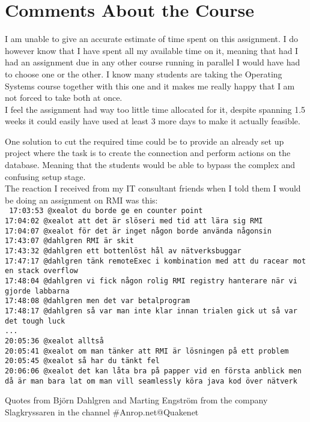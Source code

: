 \documentclass[a4paper]{scrartcl}
\begin{document}
\section{Comments About the Course}

I am unable to give an accurate estimate of time spent on this assignment. I do however know that I have spent all my available time on it, meaning that had I had an assignment due in any other course running in parallel I would have had to choose one or the other. I know many students are taking the Operating Systems course together with this one and it makes me really happy that I am not forced to take both at once.\\

I feel the assignment had way too little time allocated for it, despite spanning 1.5 weeks it could easily have used at least 3 more days to make it actually feasible.

One solution to cut the required time could be to provide an already set up project where the task is to create the connection and perform actions on the database. Meaning that the students would be able to bypass the complex and confusing setup stage.\\

The reaction I received from my IT consultant friends when I told them I would be doing an assignment on RMI was this:\\
\texttt{
17:03:53 @xealot du borde ge en counter point\\
17:04:02 @xealot att det är slöseri med tid att lära sig RMI\\
17:04:07 @xealot för det är inget någon borde använda någonsin\\
17:43:07 @dahlgren RMI är skit\\
17:43:32 @dahlgren ett bottenlöst hål av nätverksbuggar\\
17:47:17 @dahlgren tänk remoteExec i kombination med att du racear mot en stack overflow\\
17:48:04 @dahlgren vi fick någon rolig RMI registry hanterare när vi gjorde labbarna\\
17:48:08 @dahlgren men det var betalprogram\\
17:48:17 @dahlgren så var man inte klar innan trialen gick ut så var det tough luck\\
...\\
20:05:36 @xealot alltså\\
20:05:41 @xealot om man tänker att RMI är lösningen på ett problem\\
20:05:45 @xealot så har du tänkt fel\\
20:06:06 @xealot det kan låta bra på papper vid en första anblick men då är man bara lat om man vill seamlessly köra java kod över nätverk
}
\begin{center}
	Quotes from Björn Dahlgren and Marting Engström from the company Slagkryssaren in the channel #Anrop.net@Quakenet
\end{center}
\end{document}
